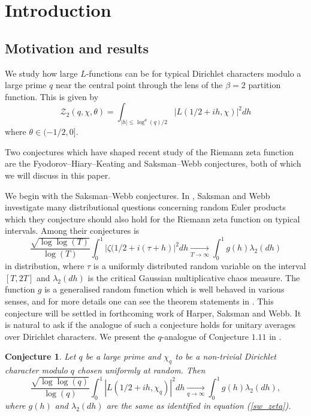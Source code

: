 \documentclass[10pt,a4paper]{amsart}
\newtheorem{conjecture}{Conjecture}
\numberwithin{equation}{section}
\begin{document}
\section{Introduction} \subsection{Motivation and results}
We study how large $L$-functions can be for typical Dirichlet characters modulo a large prime $q$ near the central point through the lens of the $\beta=2$ partition function. This is given by
\begin{equation}
    \mathcal{Z}_2(q,\chi,\theta)=\int_{|h| \leq \log^{\theta}(q)/2}|L(1/2+ih,\chi)|^2dh
\end{equation}
where $\theta \in (-1/2,0]$. \par
Two conjectures which have shaped recent study of the Riemann zeta function are the Fyodorov--Hiary--Keating and Saksman--Webb conjectures, both of which we will discuss in this paper. \par
We begin with the Saksman--Webb conjectures. In \cite{sw20}, Saksman and Webb investigate many distributional questions concerning random Euler products which they conjecture should also hold for the Riemann zeta function on typical intervals. Among their conjectures is 
\begin{equation} \label{sw_zeta}
    \frac{\sqrt{\log\log(T)}}{\log(T)}\int_0^1|\zeta(1/2+i(\tau+h)|^2dh \underset{T \rightarrow \infty}{\longrightarrow} \int_0^1g(h)\lambda_2(dh)
\end{equation}
in distribution, where $\tau$ is a uniformly distributed random variable on the interval $[T,2T]$ and $\lambda_2(dh)$ is the critical Gaussian multiplicative chaos measure. The function $g$ is a generalised random function which is well behaved in various senses, and for more details one can see the theorem statements in \cite{sw20}. This conjecture will be settled in forthcoming work of Harper, Saksman and Webb. It is natural to ask if the analogue of such a conjecture holds for unitary averages over Dirichlet characters. We present the $q$-analogue of Conjecture $1.11$ in \cite{sw20}.
\begin{conjecture} \label{q-aspect_partition_conjecture}
Let $q$ be a large prime and $\chi_q$ to be a non-trivial Dirichlet character modulo $q$ chosen uniformly at random. Then
    $$\frac{\sqrt{\log\log(q)}}{\log(q)}\int_0^1|L(1/2+ih,\chi_q)|^2dh \underset{q \rightarrow \infty}{\longrightarrow} \int_0^1g(h)\lambda_2(dh),$$
    where $g(h)$ and $\lambda_2(dh)$ are the same as identified in equation (\ref{sw_zeta}).
\end{conjecture}
\end{document}
